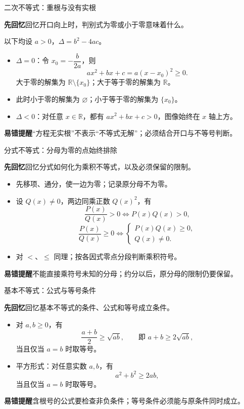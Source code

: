 \documentclass[UTF8,10pt,aspectratio=169]{ctexbeamer}
\newcommand{\Recall}[1]{\par\noindent\textcolor{KnowledgeBlue}{\textbf{先回忆}\quad #1}\par\vspace{0.3cm}}
\newcommand{\Pitfall}[1]{\par\vspace{0.22cm}\noindent\textbf{易错提醒}\quad #1\par}
\begin{document}
\begin{frame}[t]{二次不等式：重根与没有实根}
\large
\Recall{回忆开口向上时，判别式为零或小于零意味着什么。}
\pause
以下均设 $a>0$，$\Delta=b^2-4ac$。
\begin{itemize}
  \item $\Delta=0$：令 $x_0=-\dfrac{b}{2a}$，则
  \[ax^2+bx+c=a(x-x_0)^2\ge0.\]
  大于零的解集为 $\mathbb R\setminus\{x_0\}$；大于等于零的解集为 $\mathbb R$。
  \item 此时小于零的解集为 $\varnothing$；小于等于零的解集为 $\{x_0\}$。
  \item $\Delta<0$：对任意 $x\in\mathbb R$，都有 $ax^2+bx+c>0$，图像始终在 $x$ 轴上方。
\end{itemize}
\Pitfall{“方程无实根”不表示“不等式无解”；必须结合开口与不等号判断。}
\end{frame}

\begin{frame}[t]{分式不等式：分母为零的点始终排除}
\large
\Recall{回忆分式如何化为乘积不等式，以及必须保留的限制。}
\pause
\begin{itemize}
  \item 先移项、通分，使一边为零；记录原分母不为零。
  \item 设 $Q(x)\ne0$，两边同乘正数 $Q(x)^2$，有
  \[
  \frac{P(x)}{Q(x)}>0\iff P(x)Q(x)>0,
  \]
  \[
  \frac{P(x)}{Q(x)}\ge0\iff
  \begin{cases}P(x)Q(x)\ge0,\\Q(x)\ne0.\end{cases}
  \]
  \item 对 $<$、$\le$ 同理；按各因式零点分段判断乘积符号。
\end{itemize}
\Pitfall{不能直接乘符号未知的分母；约分以后，原分母的限制仍要保留。}
\end{frame}

\begin{frame}[t]{基本不等式：公式与等号条件}
\large
\Recall{回忆基本不等式的条件、公式和等号成立条件。}
\pause
\begin{itemize}
  \item 对 $a,b\ge0$，有
  \[\frac{a+b}{2}\ge\sqrt{ab},\qquad\text{即 }a+b\ge2\sqrt{ab},\]
  当且仅当 $a=b$ 时取等号。
  \item 平方形式：对任意实数 $a,b$，有
  \[a^2+b^2\ge2ab,\]
  当且仅当 $a=b$ 时取等号。
\end{itemize}
\Pitfall{含根号的公式要检查非负条件；等号条件必须能与原条件同时成立。}
\end{frame}
\end{document}
